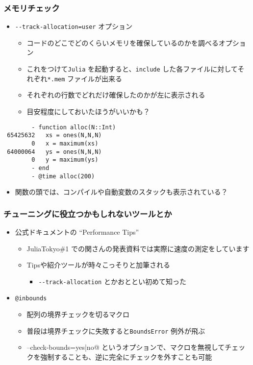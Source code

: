  \begin{frame}[containsverbatim]
 \frametitle{メモリチェック}
 \begin{itemize}
   \item \verb|--track-allocation=user| オプション
     \begin{itemize}
       \item コードのどこでどのくらいメモリを確保しているのかを調べるオプション
       \item これをつけて\verb|Julia| を起動すると、\verb|include| した各ファイルに対してそれぞれ\verb|*.mem| ファイルが出来る
       \item それぞれの行数でどれだけ確保したのかが左に表示される
       \item 目安程度にしておいたほうがいいかも？
     \end{itemize}
 \end{itemize}
 \begin{lstlisting}
        - function alloc(N::Int)
 65425632   xs = ones(N,N,N)
        0   x = maximum(xs)
 64000064   ys = ones(N,N,N)
        0   y = maximum(ys)
        - end
        - @time alloc(200)
 \end{lstlisting}
 \begin{itemize}
   \item 関数の頭では、コンパイルや自動変数のスタックも表示されている？
 \end{itemize}
 \end{frame}

 \begin{frame}[containsverbatim]
 \frametitle{チューニングに役立つかもしれないツールとか}
 \begin{itemize}
   \item 公式ドキュメントの ``Performance Tips''
     \begin{itemize}
       \item JuliaTokyo\#1 での関さんの発表資料では実際に速度の測定をしています
       \item Tipsや紹介ツールが時々こっそりと加筆される
         \begin{itemize}
           \item \verb|--track-allocation| とかおととい初めて知った
         \end{itemize}
     \end{itemize}
   \item \verb|@inbounds|
     \begin{itemize}
       \item 配列の境界チェックを切るマクロ
       \item 普段は境界チェックに失敗すると\verb|BoundsError| 例外が飛ぶ
       \item \verb@--check-bounds={yes|no}@ というオプションで、マクロを無視してチェックを強制することも、逆に完全にチェックを外すことも可能
     \end{itemize}
 \end{itemize}
 \end{frame}

